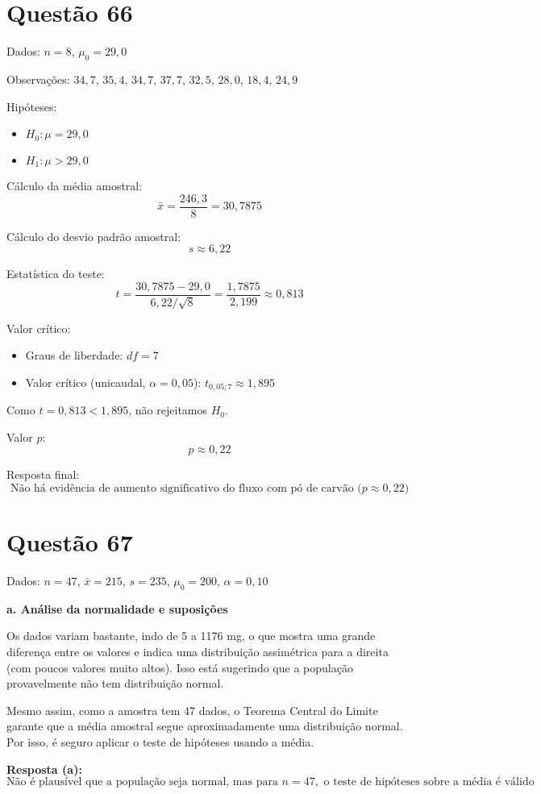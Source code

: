 \documentclass[12pt]{article}
\newcommand{\quest}[1]{\section*{Questão #1}} %
\begin{document}
\quest{66}

Dados: $n = 8$, $\mu_0 = 29{,}0$

Observações: $34{,}7$, $35{,}4$, $34{,}7$, $37{,}7$, $32{,}5$, $28{,}0$, $18{,}4$, $24{,}9$

Hipóteses:
\begin{itemize}
  \item $H_0: \mu = 29{,}0$
  \item $H_1: \mu > 29{,}0$
\end{itemize}

Cálculo da média amostral:
\[
\bar{x} = \frac{246{,}3}{8} = 30{,}7875
\]

Cálculo do desvio padrão amostral:
\[
s \approx 6{,}22
\]

Estatística do teste:
\[
t = \frac{30{,}7875 - 29{,}0}{6{,}22 / \sqrt{8}} = \frac{1{,}7875}{2{,}199} \approx 0{,}813
\]

Valor crítico:
\begin{itemize}
  \item Graus de liberdade: $df = 7$
  \item Valor crítico (unicaudal, $\alpha = 0{,}05$): $t_{0{,}05; 7} \approx 1{,}895$
\end{itemize}

Como $t = 0{,}813 < 1{,}895$, não rejeitamos $H_0$.

Valor $p$:
\[
p \approx 0{,}22
\]

Resposta final:
\[
\boxed{\text{Não há evidência de aumento significativo do fluxo com pó de carvão ($p \approx 0{,}22$)}}
\]

\quest{67}

Dados: $n = 47$, $\bar{x} = 215$, $s = 235$, $\mu_0 = 200$, $\alpha = 0{,}10$

\textbf{a. Análise da normalidade e suposições}

Os dados variam bastante, indo de 5 a 1176 mg, o que mostra uma grande diferença entre os valores e indica uma distribuição assimétrica para a direita (com poucos valores muito altos). Isso está sugerindo que a população provavelmente não tem distribuição normal.

Mesmo assim, como a amostra tem 47 dados, o Teorema Central do Limite garante que a média amostral segue aproximadamente uma distribuição normal. Por isso, é seguro aplicar o teste de hipóteses usando a média.

\textbf{Resposta (a):}
\[
\boxed{\text{Não é plausível que a população seja normal, mas para } n = 47, \text{ o teste de hipóteses sobre a média é válido}}
\]
\end{document}

